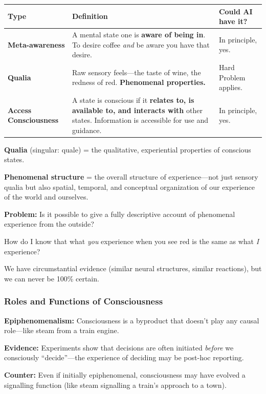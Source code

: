 \begin{center}
\renewcommand{\arraystretch}{1.4}
\begin{tabular}{@{} l p{6cm} p{4cm} @{}}
\toprule
\textbf{Type} & \textbf{Definition} & \textbf{Could AI have it?} \\
\midrule
\textbf{Meta-awareness} & A mental state one is \textbf{aware of being in}. To desire coffee \textit{and} be aware you have that desire. & In principle, yes. \\
\textbf{Qualia} & Raw sensory feels---the taste of wine, the redness of red. \textbf{Phenomenal properties.} & Hard Problem applies. \\
\textbf{Access Consciousness} & A state is conscious if it \textbf{relates to, is available to, and interacts with} other states. Information is accessible for use and guidance. & In principle, yes. \\
\bottomrule
\end{tabular}
\end{center}

\begin{defbox}
\textbf{Qualia} (singular: quale) = the qualitative, experiential properties of conscious states.

\textbf{Phenomenal structure} = the overall structure of experience---not just sensory qualia but also spatial, temporal, and conceptual organization of our experience of the world and ourselves.

\textbf{Problem:} Is it possible to give a fully descriptive account of phenomenal experience from the outside?
\end{defbox}

\begin{exbox}
How do I know that what \textit{you} experience when you see red is the same as what \textit{I} experience?

We have circumstantial evidence (similar neural structures, similar reactions), but we can never be 100\% certain.
\end{exbox}

\bigseparator

\subsubsection{Roles and Functions of Consciousness}

\begin{thmbox}
\textbf{Epiphenomenalism:} Consciousness is a byproduct that doesn't play any causal role---like steam from a train engine.

\textbf{Evidence:} Experiments show that decisions are often initiated \textit{before} we consciously ``decide''---the experience of deciding may be post-hoc reporting.

\textbf{Counter:} Even if initially epiphenomenal, consciousness may have evolved a signalling function (like steam signalling a train's approach to a town).
\end{thmbox}

